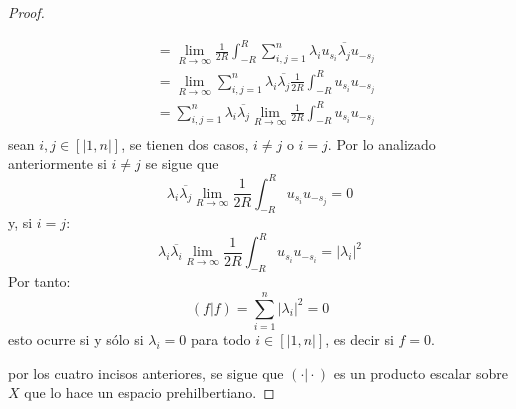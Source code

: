 \documentclass[12pt]{report}
\newcounter{it}
\theoremstyle{largebreak}
\newcommand\abs[1]{\ensuremath{\big|#1\big|}}
\newcommand\pint[2]{\ensuremath{\left(#1\big|#2\right)}}
\newcommand\conj[1]{\ensuremath{\overline{#1}}}
\begin{document}
\begin{proof}
\begin{enumerate}
\begin{equation*}
\begin{split}
                    &= \lim_{R\rightarrow\infty }\frac{1}{2R}\int_{-R}^{R}\sum_{i,j=1 }^n \lambda_i u_{s_i }\conj{\lambda_j}u_{ -s_j} \\
                    &= \lim_{R\rightarrow\infty }\sum_{i,j=1 }^n\lambda_i\conj{\lambda_j}\frac{1}{2R}\int_{-R}^{R}  u_{s_i }u_{ -s_j} \\
                    &= \sum_{i,j=1 }^n\lambda_i\conj{\lambda_j}\lim_{R\rightarrow\infty }\frac{1}{2R}\int_{-R}^{R} u_{s_i }u_{ -s_j} \\
                \end{split}
            \end{equation*}
            sean $i,j\in\left[|1,n|\right]$, se tienen dos casos, $i\neq j$ o $i=j$. Por lo analizado anteriormente si $i\neq j$ se sigue que
            \begin{equation*}
                \lambda_i\conj{\lambda_j}\lim_{R\rightarrow\infty }\frac{1}{2R}\int_{-R}^{R}u_{s_i }u_{ -s_j}=0
            \end{equation*}
            y, si $i=j$:
            \begin{equation*}
                \lambda_i\conj{\lambda_i}\lim_{R\rightarrow\infty }\frac{1}{2R}\int_{-R}^{R}u_{s_i }u_{ -s_i}=\abs{\lambda_i}^2
            \end{equation*}
            Por tanto:
            \begin{equation*}
                \pint{f}{f}=\sum_{ i=1}^n\abs{\lambda_i}^2=0
            \end{equation*}
            esto ocurre si y sólo si $\lambda_i=0$ para todo $i\in\left[|1,n|\right]$, es decir si $f=0$.
        \end{enumerate}
        por los cuatro incisos anteriores, se sigue que $\pint{\cdot}{\cdot}$ es un producto escalar sobre $X$ que lo hace un espacio prehilbertiano.


\end{proof}
\end{document}
